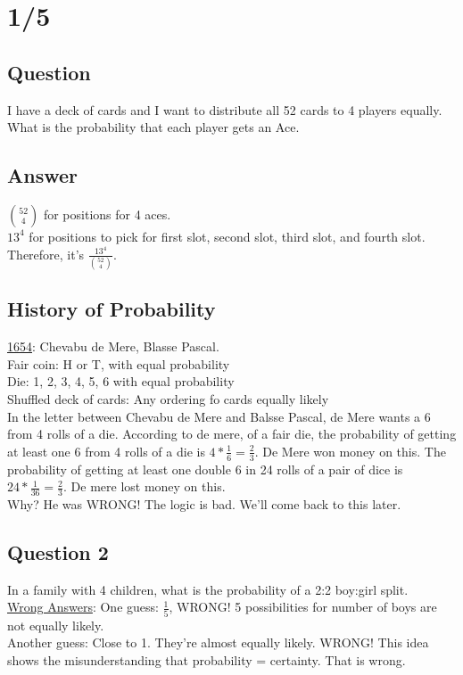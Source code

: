 \section*{1/5}
  \subsection*{Question}
    I have a deck of cards and I want to distribute all 52 cards to 4 players 
    equally. What is the probability that each player gets an Ace.
  \subsection*{Answer}
    $\binom{52}{4}$ for positions for 4 aces.\\
    $13^4$ for positions to pick for first slot, second slot, third slot, and
    fourth slot. \\
    Therefore, it's $\frac{13^4}{\binom{52}{4}}$.

  \subsection*{History of Probability}
    \underline{1654}: Chevabu de Mere, Blasse Pascal.\\
      Fair coin: H or T, with equal probability\\
      Die: 1, 2, 3, 4, 5, 6 with equal probability\\
      Shuffled deck of cards: Any ordering fo cards equally likely\\
      In the letter between Chevabu de Mere and Balsse Pascal, de Mere
      wants a 6 from 4 rolls of a die. According to de mere, of a fair die,
      the probability of getting at least one 6 from 4 rolls of a die is
      $4 * \frac{1}{6} = \frac{2}{3}$. De Mere won money on this. The 
      probability of getting at least one double 6 in 24 rolls of a 
      pair of dice is $24 * \frac{1}{36} = \frac{2}{3}$. De mere lost money
      on this.\\
      Why? He was WRONG! The logic is bad.  We'll come back to this later.

  \subsection*{Question 2}
    In a family with 4 children, what is the probability of a 2:2 boy:girl 
    split.\\
    \underline{Wrong Answers}: One guess: $\frac{1}{5}$, WRONG! 5 
    possibilities for number of boys are not equally likely.\\
    Another guess: Close to 1. They're almost equally likely. WRONG! This idea
    shows the misunderstanding that probability = certainty. That is wrong.\\

